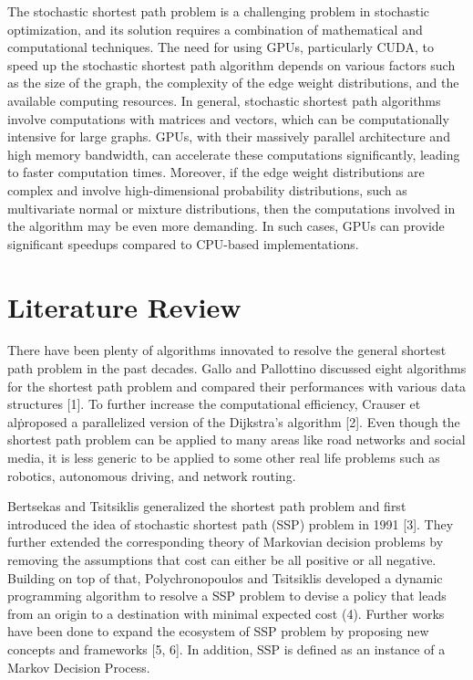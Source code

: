 \documentclass{article}
\begin{document}
The stochastic shortest path problem is a challenging problem in stochastic optimization, 
and its solution requires a combination of mathematical and computational techniques. 
The need for using GPUs, particularly CUDA, to speed up the stochastic shortest path algorithm 
depends on various factors such as the size of the graph, the complexity of the edge weight distributions, 
and the available computing resources. In general, stochastic shortest path algorithms involve computations 
with matrices and vectors, which can be computationally intensive for large graphs. GPUs, 
with their massively parallel architecture and high memory bandwidth, can accelerate these 
computations significantly, leading to faster computation times. Moreover, if the edge weight distributions 
are complex and involve high-dimensional probability distributions, such as multivariate normal or mixture distributions, 
then the computations involved in the algorithm may be even more demanding. In such cases, 
GPUs can provide significant speedups compared to CPU-based implementations.

\section{Literature Review}

There have been plenty of algorithms innovated to resolve the general shortest path problem in the past decades. 
Gallo and Pallottino discussed eight algorithms for the shortest path problem and compared their performances 
with various data structures [1]. To further increase the computational efficiency, Crauser et al\. proposed a 
parallelized version of the Dijkstra's algorithm [2]. Even though the shortest path problem can be applied to 
many areas like road networks and social media, it is less generic to be applied to some other real life problems 
such as robotics, autonomous driving, and network routing.  

Bertsekas and Tsitsiklis generalized the shortest path problem and first introduced the idea of stochastic shortest path (SSP) 
problem in 1991 [3]. They further extended the corresponding theory of Markovian decision problems 
by removing the assumptions that cost can either be all positive or all negative. Building on top 
of that, Polychronopoulos and Tsitsiklis developed a dynamic programming algorithm to resolve a SSP 
problem to devise a policy that leads from an origin to a destination with minimal expected cost (4). 
Further works have been done to expand the ecosystem of SSP problem by proposing new concepts and frameworks [5, 6]. 
In addition, SSP is defined as an instance of a Markov Decision Process. 
\end{document}
